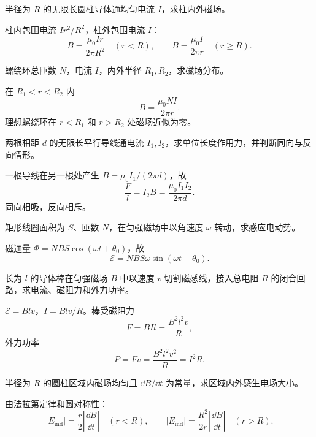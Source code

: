 \begin{exercise}[level=standard]
半径为 $R$ 的无限长圆柱导体通均匀电流 $I$，求柱内外磁场。
\begin{solution}
柱内包围电流 $I r^2/R^2$，柱外包围电流 $I$：
\[
  B=\frac{\mu_0Ir}{2\pi R^2}\quad(r<R),\qquad
  B=\frac{\mu_0I}{2\pi r}\quad(r\ge R).
\]
\end{solution}
\end{exercise}

\begin{exercise}[level=standard]
螺绕环总匝数 $N$，电流 $I$，内外半径 $R_1,R_2$，求磁场分布。
\begin{solution}
在 $R_1<r<R_2$ 内
\[
  B=\frac{\mu_0NI}{2\pi r}.
\]
理想螺绕环在 $r<R_1$ 和 $r>R_2$ 处磁场近似为零。
\end{solution}
\end{exercise}

\begin{exercise}[level=standard]
两根相距 $d$ 的无限长平行导线通电流 $I_1,I_2$，求单位长度作用力，并判断同向与反向情形。
\begin{solution}
一根导线在另一根处产生 $B=\mu_0I_1/(2\pi d)$，故
\[
  \frac{F}{l}=I_2B=\frac{\mu_0I_1I_2}{2\pi d}.
\]
同向相吸，反向相斥。
\end{solution}
\end{exercise}

\begin{exercise}[level=standard]
矩形线圈面积为 $S$、匝数 $N$，在匀强磁场中以角速度 $\omega$ 转动，求感应电动势。
\begin{solution}
磁通量 $\Phi=NBS\cos(\omega t+\theta_0)$，故
\[
  \mathcal E=NBS\omega\sin(\omega t+\theta_0).
\]
\end{solution}
\end{exercise}

\begin{exercise}[level=standard]
长为 $l$ 的导体棒在匀强磁场 $B$ 中以速度 $v$ 切割磁感线，接入总电阻 $R$ 的闭合回路，求电流、磁阻力和外力功率。
\begin{solution}
$\mathcal E=Blv$，$I=Blv/R$。棒受磁阻力
\[
  F=BIl=\frac{B^2l^2v}{R},
\]
外力功率
\[
  P=Fv=\frac{B^2l^2v^2}{R}=I^2R.
\]
\end{solution}
\end{exercise}

\begin{exercise}[level=standard]
半径为 $R$ 的圆柱区域内磁场均匀且 $\dd B/\dd t$ 为常量，求区域内外感生电场大小。
\begin{solution}
由法拉第定律和圆对称性：
\[
  |E_{\mathrm{ind}}|=\frac{r}{2}\left|\frac{\dd B}{\dd t}\right|\quad(r<R),
  \qquad
  |E_{\mathrm{ind}}|=\frac{R^2}{2r}\left|\frac{\dd B}{\dd t}\right|\quad(r>R).
\]
\end{solution}
\end{exercise}

